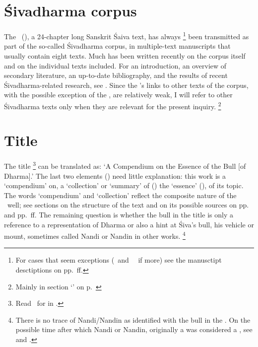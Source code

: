 

\thispagestyle{empty}
\frenchspacing

\section{Śivadharma corpus}
\fancyhead[LE]{}
\fancyhead[RE]{}
\fancyhead[LO]{}
\fancyhead[RO]{}

The \Vss\ (\VSS), a 24-chapter long Sanskrit Śaiva text,
has always%
		\footnote{For cases that seem exceptions 
		(\msKoa\ and \msPaperA\ \CHECK\ if more)
						see the manusctipt desctiptions 
						on pp.~\pageref{mss_descr}ff.}
been transmitted as part of the so-called Śivadharma corpus,
in multiple-text manuscripts that usually contain 
eight texts. Much has been written recently
on the corpus itself and on the individual
texts included. 
For an introduction, an overview of secondary 
literature, an up-to-date bibliography, and the results of 
recent Śivadharma-related research, see
. 
Since the \VSS's links to other texts of the corpus, 
with the possible exception of the \DharmP, 
are relatively weak, I will refer to other
Śivadharma texts only when they are relevant
for the present inquiry.%
		\footnote{Mainly in section `\CHECK' on 
		p.~\pageref{vss_connection_other_sd_texts}}




\section{Title}\label{title}
The title \Vss%
	\footnote{Read \Vss\ for 
	in .}
can be translated as:
`A Compendium on the Essence of the Bull [of Dharma].'
The last two elements () need
little explanation: this work is a 
`compendium' on, a `collection' or `summary' of ()
the `essence' (), of its topic. The words 
`compendium' and `collection' reflect the composite nature of
the \Vss\ well; see sections on the structure of the text and
on its possible sources on 
pp.~\pageref{structure} and 
pp.~\pageref{vss_connection_other_texts}ff. 
The\label{bull} remaining question is whether the bull in the title 
is only a reference to a representation of Dharma 
or also a hint at Śiva's bull, his vehicle or mount, 
sometimes called Nandi or Nandin in other works.%
		\footnote{There is no trace of Nandi/Nandin
		as identified with the bull in the \Vss.
		On the possible time after which 
		Nandi or Nandin, originally a  
		was considered a , see 
		 and 
		.}

